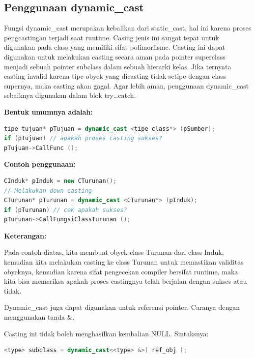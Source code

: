 \subsection{Penggunaan dynamic\_cast}\label{penggunaan-dynamicux5fcast}

Fungsi dynamic\_cast merupakan kebalikan dari static\_cast, hal ini
karena proses pengcastingan terjadi saat runtime. Casing jenis ini
sangat tepat untuk digunakan pada class yang memiliki sifat
polimorfisme. Casting ini dapat digunakan untuk melakukan casting secara
aman pada pointer superclass menjadi sebuah pointer subclass dalam
sebuah hierarki kelas. Jika ternyata casting invalid karena tipe obyek
yang dicasting tidak setipe dengan class supernya, maka casting akan
gagal. Agar lebih aman, penggunaan dynamic\_cast sebaiknya digunakan
dalam blok try\ldots{}catch.

\textbf{Bentuk umumnya adalah:}

\begin{lstlisting}[language=c++, numbers=none]
tipe_tujuan* pTujuan = dynamic_cast <tipe_class*> (pSumber);
if (pTujuan) // apakah proses casting sukses?
pTujuan->CallFunc ();
\end{lstlisting}

\textbf{Contoh penggunaan:}

\begin{lstlisting}[language=c++, numbers=none]
CInduk* pInduk = new CTurunan();
// Melakukan down casting
CTurunan* pTurunan = dynamic_cast <CTurunan*> (pInduk);
if (pTurunan) // cek apakah sukses?
pTurunan->CallFungsiClassTurunan ();
\end{lstlisting}

\textbf{Keterangan:}

Pada contoh diatas, kita membuat obyek class Turunan dari class Induk,
kemudian kita melakukan casting ke class Turunan untuk memastikan
validitas obyeknya, kemudian karena sifat pengecekan compiler bersifat
runtime, maka kita bisa memeriksa apakah proses castingnya telah
berjalan dengan sukses atau tidak.

Dynamic\_cast juga dapat digunakan untuk referensi pointer. Caranya
dengan menggunakan tanda \&.

Casting ini tidak boleh menghasilkan kembalian NULL. Sintaksnya:

\begin{lstlisting}[language=c++, numbers=none]
<type> subclass = dynamic_cast<<type> &>( ref_obj );
\end{lstlisting}

